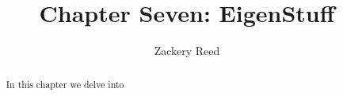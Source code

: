 \documentclass{xourse}
\title{Chapter Seven: EigenStuff}
\author{Zackery Reed}
\begin{document}
\begin{abstract}
    In this chapter we delve into 
\end{abstract}
\maketitle

\sectionstyle
\end{document}
